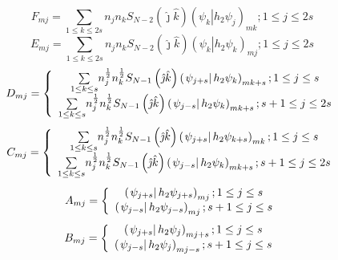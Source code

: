 \documentclass[aps,preprint]{revtex4}%
\begin{document}
\begin{equation}
F_{mj}=\sum_{1\leq k\leq2s}n_{j}n_{k}S_{N-2}\left(  \hat{\jmath}\hat
{k}\right)  \left(  \left.  \psi_{k}\right\vert h_{2}\psi_{j}\right)
_{mk};1\leq j\leq2s
\end{equation}%
\begin{equation}
E_{mj}=\sum_{1\leq k\leq2s}n_{j}n_{k}S_{N-2}\left(  \hat{\jmath}\hat
{k}\right)  \left(  \left.  \psi_{k}\right\vert h_{2}\psi_{k}\right)
_{mj};1\leq j\leq2s
\end{equation}%
\begin{equation}
D_{mj}=\left\{
\begin{array}
[c]{c}%
{\textstyle\sum\limits_{1\leq k\leq s}}
n_{j}^{\frac{1}{2}}n_{k}^{\frac{1}{2}}S_{N-1}\left(  \hat{\jmath}\hat
{k}\right)  \left(  \left.  \psi_{j+s}\right\vert h_{2}\psi_{k}\right)
_{mk+s};1\leq j\leq s\\%
{\textstyle\sum\limits_{1\leq k\leq s}}
n_{j}^{\frac{1}{2}}n_{k}^{\frac{1}{2}}S_{N-1}\left(  \hat{\jmath}\hat
{k}\right)  \left(  \left.  \psi_{j-s}\right\vert h_{2}\psi_{k}\right)
_{mk+s};s+1\leq j\leq2s
\end{array}
\right.
\end{equation}%
\begin{equation}
C_{mj}=\left\{
\begin{array}
[c]{c}%
{\textstyle\sum\limits_{1\leq k\leq s}}
n_{j}^{\frac{1}{2}}n_{k}^{\frac{1}{2}}S_{N-1}\left(  \hat{\jmath}\hat
{k}\right)  \left(  \left.  \psi_{j+s}\right\vert h_{2}\psi_{k+s}\right)
_{mk};1\leq j\leq s\\%
{\textstyle\sum\limits_{1\leq k\leq s}}
n_{j}^{\frac{1}{2}}n_{k}^{\frac{1}{2}}S_{N-1}\left(  \hat{\jmath}\hat
{k}\right)  \left(  \left.  \psi_{j-s}\right\vert h_{2}\psi_{k}\right)
_{mk+s};s+1\leq j\leq2s
\end{array}
\right.
\end{equation}%
\begin{equation}
A_{mj}=\left\{
\begin{array}
[c]{c}%
\left(  \left.  \psi_{j+s}\right\vert h_{2}\psi_{j+s}\right)  _{mj};1\leq
j\leq s\\
\left(  \left.  \psi_{j-s}\right\vert h_{2}\psi_{j-s}\right)  _{mj};s+1\leq
j\leq s
\end{array}
\right.
\end{equation}%
\begin{equation}
B_{mj}=\left\{
\begin{array}
[c]{c}%
\left(  \left.  \psi_{j+s}\right\vert h_{2}\psi_{j}\right)  _{mj+s};1\leq
j\leq s\\
\left(  \left.  \psi_{j-s}\right\vert h_{2}\psi_{j}\right)  _{mj-s};s+1\leq
j\leq s
\end{array}
\right.
\end{equation}
\end{document}
